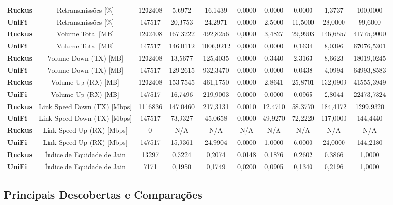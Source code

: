 \begin{table}[H]
{{\begin{tabular}{lccccccccc}
      \textbf{Ruckus} & Retransmissões [\%] & 1202408 & 5,6972 & 16,1439 & 0,0000 & 0,0000 & 0,0000 & 1,3737 & 100,0000 \\
      \textbf{UniFi} & Retransmissões [\%] & 147517 & 20,3753 & 24,2971 & 0,0000 & 2,5000 & 11,5000 & 28,0000 & 99,6000 \\
      \textbf{Ruckus} & Volume Total [MB] & 1202408 & 167,3222 & 492,8256 & 0,0000 & 3,4827 & 29,9903 & 146,6557 & 41775,9000 \\
      \textbf{UniFi} & Volume Total [MB] & 147517 & 146,0112 & 1006,9212 & 0,0000 & 0,0000 & 0,1634 & 8,0396 & 67076,5301 \\
      \textbf{Ruckus} & Volume Down (TX) [MB] & 1202408 & 13,5677 & 125,4035 & 0,0000 & 0,3440 & 2,3163 & 8,6623 & 18019,0245 \\
      \textbf{UniFi} & Volume Down (TX) [MB] & 147517 & 129,2615 & 932,3470 & 0,0000 & 0,0000 & 0,0438 & 4,0994 & 64993,8583 \\
      \textbf{Ruckus} & Volume Up (RX) [MB] & 1202408 & 153,7545 & 461,1750 & 0,0000 & 2,8641 & 25,8701 & 132,0909 & 41555,3949 \\
      \textbf{UniFi} & Volume Up (RX) [MB] & 147517 & 16,7496 & 219,9003 & 0,0000 & 0,0000 & 0,0965 & 2,8044 & 22473,7324 \\
      \textbf{Ruckus} & Link Speed Down (TX) [Mbps] & 1116836 & 147,0460 & 217,3131 & 0,0010 & 12,4710 & 58,3770 & 184,4172 & 1299,9320 \\
      \textbf{UniFi} & Link Speed Down (TX) [Mbps] & 147517 & 73,9327 & 45,0658 & 0,0000 & 49,9270 & 72,2220 & 117,0000 & 144,4440 \\
      \textbf{Ruckus} & Link Speed Up (RX) [Mbps] & 0 & N/A & N/A & N/A & N/A & N/A & N/A & N/A \\
      \textbf{UniFi} & Link Speed Up (RX) [Mbps] & 147517 & 15,9361 & 24,9904 & 0,0000 & 1,0000 & 6,0000 & 24,0000 & 144,2180 \\
      \textbf{Ruckus} & Índice de Equidade de Jain & 13297 & 0,3224 & 0,2074 & 0,0148 & 0,1876 & 0,2602 & 0,3866 & 1,0000 \\
      \textbf{UniFi} & Índice de Equidade de Jain & 7171 & 0,1950 & 0,1749 & 0,0200 & 0,0905 & 0,1340 & 0,2196 & 1,0000 \\
      \bottomrule
    \end{tabular}%
  }%
}{%
}
\end{table}

\subsection{Principais Descobertas e Comparações}


